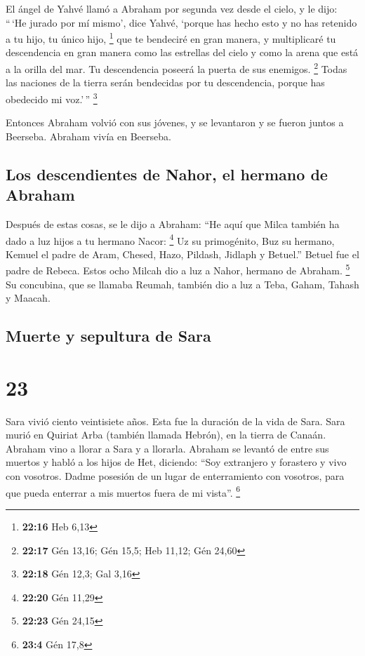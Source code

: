  El ángel de Yahvé llamó a Abraham por segunda vez desde
el cielo,  y le dijo: ``\,`He jurado por mí mismo', dice
Yahvé, `porque has hecho esto y no has retenido a tu hijo, tu único
hijo, \footnote{\textbf{22:16} Heb 6,13}  que te
bendeciré en gran manera, y multiplicaré tu descendencia en gran manera
como las estrellas del cielo y como la arena que está a la orilla del
mar. Tu descendencia poseerá la puerta de sus enemigos. \footnote{\textbf{22:17}
  Gén 13,16; Gén 15,5; Heb 11,12; Gén 24,60}  Todas las
naciones de la tierra serán bendecidas por tu descendencia, porque has
obedecido mi voz.'\,'' \footnote{\textbf{22:18} Gén 12,3; Gal 3,16}

 Entonces Abraham volvió con sus jóvenes, y se levantaron
y se fueron juntos a Beerseba. Abraham vivía en Beerseba.

\hypertarget{los-descendientes-de-nahor-el-hermano-de-abraham}{%
\subsection{Los descendientes de Nahor, el hermano de
Abraham}\label{los-descendientes-de-nahor-el-hermano-de-abraham}}

 Después de estas cosas, se le dijo a Abraham: ``He aquí
que Milca también ha dado a luz hijos a tu hermano Nacor: \footnote{\textbf{22:20}
  Gén 11,29}  Uz su primogénito, Buz su hermano, Kemuel
el padre de Aram,  Chesed, Hazo, Pildash, Jidlaph y
Betuel.''  Betuel fue el padre de Rebeca. Estos ocho
Milcah dio a luz a Nahor, hermano de Abraham. \footnote{\textbf{22:23}
  Gén 24,15}  Su concubina, que se llamaba Reumah,
también dio a luz a Teba, Gaham, Tahash y Maacah.

\hypertarget{muerte-y-sepultura-de-sara}{%
\subsection{Muerte y sepultura de
Sara}\label{muerte-y-sepultura-de-sara}}

\hypertarget{section-22}{%
\section{23}\label{section-22}}

 Sara vivió ciento veintisiete años. Esta fue la duración
de la vida de Sara.  Sara murió en Quiriat Arba (también
llamada Hebrón), en la tierra de Canaán. Abraham vino a llorar a Sara y
a llorarla.  Abraham se levantó de entre sus muertos y
habló a los hijos de Het, diciendo:  ``Soy extranjero y
forastero y vivo con vosotros. Dadme posesión de un lugar de
enterramiento con vosotros, para que pueda enterrar a mis muertos fuera
de mi vista''. \footnote{\textbf{23:4} Gén 17,8}

